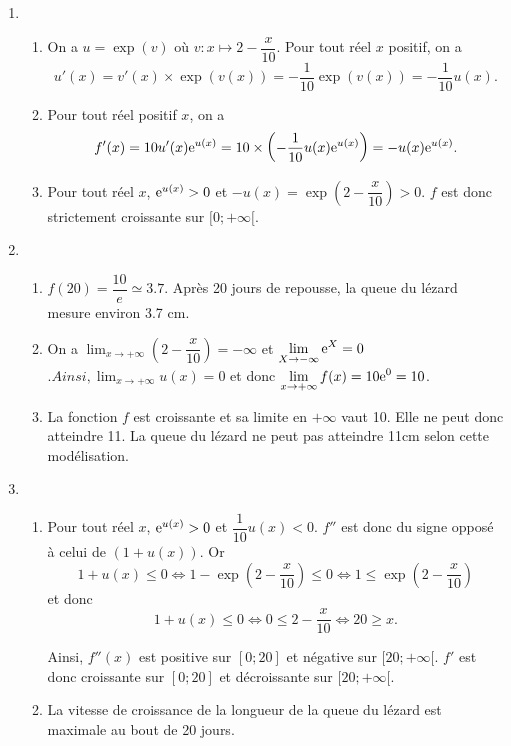 \documentclass[11pt,fleqn, openany]{book} %
\begin{document}
\begin{solution}\hspace{10pt}
\begin{enumerate}
\item \begin{enumerate}
\item On a $u=\exp(v)$ où $v:x\mapsto 2-\dfrac{x}{10}$. Pour tout réel $x$ positif, on a
\[u'(x)=v'(x)\times \exp(v(x)) =-\dfrac{1}{10}\exp(v(x)) =  -\dfrac{1}{10}u(x).\]
\item Pour tout réel positif $x$, on a 
\[f'(x)= 10u'(x) \mathrm{e}^{u(x)} = 10 \times \left( -\dfrac{1}{10}u(x)\mathrm{e}^{u(x)} \right)=-u(x)\mathrm{e}^{u(x)} .\]
\item Pour tout réel $x$, $\mathrm{e}^{u(x)}>0$ et $-u(x)=\exp\left(2-\dfrac{x}{10}\right)>0$. $f$ est donc strictement croissante sur $[0;+\infty[$.\end{enumerate}
\item \begin{enumerate}
\item $f(20) = \dfrac{10}{e}\simeq 3.7$. Après 20 jours de repousse, la queue du lézard mesure environ 3.7 cm.
\item On a $\displaystyle \lim_{x\to + \infty}\left(2-\dfrac{x}{10}\right)=-\infty$ et $\displaystyle \lim_{X\to - \infty}\mathrm{e}^X=0$ $. Ainsi, \displaystyle \lim_{x\to + \infty} u(x)=0$ et donc $\displaystyle \lim_{x \to + \infty} f(x) = 10\mathrm{e}^0=10$.
\item La fonction $f$ est croissante et sa limite en $+\infty$ vaut 10. Elle ne peut donc atteindre 11. La queue du lézard ne peut pas atteindre 11cm selon cette modélisation.\end{enumerate}
\item \begin{enumerate} \item Pour tout réel $x$, $\mathrm{e}^{u(x)}>0$ et $\dfrac{1}{10}u(x)<0$. $f''$ est donc du signe opposé à celui de $(1+u(x))$. Or
 \[1+u(x) \leqslant 0 \Leftrightarrow  1- \exp\left(2-\dfrac{x}{10}\right) \leqslant 0 \Leftrightarrow 1 \leqslant \exp\left(2-\dfrac{x}{10}\right)\]
 et donc
 \[ 1+u(x) \leqslant 0 \Leftrightarrow 0 \leqslant 2-\dfrac{x}{10} \Leftrightarrow 20 \geqslant x.\]
 
 Ainsi, $f''(x)$ est positive sur $[0;20] $ et négative sur $[20;+\infty[$. $f'$ est donc croissante sur $[0;20]$ et décroissante sur $[20;+\infty[$. 

\item La vitesse de croissance de la longueur de la queue du lézard est maximale au bout de 20 jours.
\end{enumerate}
\end{enumerate}\end{solution}
\end{document}

